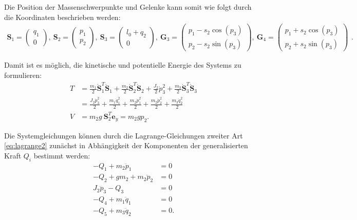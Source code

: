 Die Position der Massenschwerpunkte und Gelenke kann somit wie folgt durch die Koordinaten beschrieben werden:
\begin{equation}
\begin{smallmatrix}
\mathbf{S}_1 =
\begin{pmatrix}
q_1 \\
0
\end{pmatrix}, 
\
\mathbf{S}_2 =
\begin{pmatrix}
p_1 \\
p_2
\end{pmatrix},
\
\mathbf{S}_3 =
\begin{pmatrix}
l_0 + q_2 \\
0
\end{pmatrix},
\
\mathbf{G}_3 =
\left(\begin{matrix}
p_{1} - s_{2} \cos{\left(p_{3} \right)}\\
p_{2} - s_{2} \sin{\left(p_{3} \right)}
\end{matrix}\right),
\
\mathbf{G}_4 =
\left(\begin{matrix}
p_{1} + s_{2} \cos{\left(p_{3} \right)}\\
p_{2} + s_{2} \sin{\left(p_{3} \right)}
\end{matrix}\right)
\end{smallmatrix}.
\end{equation}

Damit ist es möglich, die kinetische und potentielle Energie des Systems zu formulieren:
\begin{align}
T &= \frac{m_1}{2} \dot{\mathbf{S}}_1^T \dot{\mathbf{S}}_1 + \frac{m_2}{2} \dot{\mathbf{S}}_2^T \dot{\mathbf{S}}_2 + \frac{J_2}{2} \dot{p}_3^2 + \frac{m_3}{2} \dot{\mathbf{S}}_3^T \dot{\mathbf{S}}_3 \nonumber \\  
&= \frac{J_{2} \dot{p}_{3}^{2}}{2} + \frac{m_{1} \dot{q}_{1}^{2}}{2} + \frac{m_{2} \dot{p}_{1}^{2}}{2} + \frac{m_{2} \dot{p}_{2}^{2}}{2} + \frac{m_{3} \dot{q}_{2}^{2}}{2} \\
V &= m_2 g \ \mathbf{S}_2^T \mathbf{e}_y = m_{2} g p_{2}.
\end{align}

Die Systemgleichungen können durch die Lagrange-Gleichungen zweiter Art \eqref{eq:lagrange2} zunächst in Abhängigkeit der Komponenten der generalisierten Kraft $Q_i$ bestimmt werden:
\begin{subequations}
	\label{eq:double_crane_ODE_w_Q}
	\begin{align}
	- Q_{1} + m_{2} \ddot{p}_{1} &= 0\\
	- Q_{2} + g m_{2} + m_{2} \ddot{p}_{2} &= 0\\
	J_{2} \ddot{p}_{3} - Q_{3} &= 0\\
	- Q_{4} + m_{1} \ddot{q}_{1} &= 0\\
	- Q_{5} + m_{3} \ddot{q}_{2} &= 0.
	\end{align}
\end{subequations}

